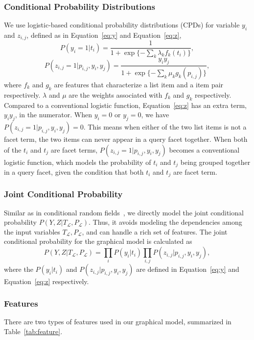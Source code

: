 \subsubsection{Conditional Probability Distributions}
We use logistic-based conditional probability distributions (CPDs) for variable $y_i$ and $z_{i,j}$, defined as in Equation~\ref{eq:y} and Equation~\ref{eq:z},
\begin{equation}
\label{eq:y}
P(y_i = 1|t_i)=\frac{1}{1+\exp\{-\sum_k{\lambda_k f_k(t_i)}\}},
\end{equation}
\begin{equation}
\label{eq:z}
P(z_{i,j} = 1|p_{i,j},y_i, y_j)=\frac{y_i y_j}{1+\exp\{-\sum_k{\mu_k g_k(p_{i,j})}\}},
\end{equation}
where $f_k$ and $g_k$ are features that characterize a list item and a item pair respectively. $\lambda$ and $\mu$ are the weights associated with $f_k$ and $g_k$ respectively. Compared to a conventional logistic function, Equation~\ref{eq:z} has an extra term, $y_iy_j$, in the numerator. When $y_i=0$ or $y_j=0$, we have $P(z_{i,j}=1|p_{i,j},y_i,y_j)=0$. This means when either of the two list items is not a facet term, the two items can never appear in a query facet together.
When both of the $t_i$ and $t_j$ are facet terms, $P(z_{i,j}=1|p_{i,j},y_i,y_j)$ becomes a conventional logistic function, which models the probability of $t_i$ and $t_j$ being grouped together in a query facet, given the condition that both $t_i$ and $t_j$ are facet term.

\subsubsection{Joint Conditional Probability}
Similar as in conditional random fields~\cite{lafferty2001conditional}, we directly model the joint conditional probability $P(Y,Z|T_{\mathcal{L}},P_{\mathcal{L}})$. Thus, it avoids modeling the dependencies among the input variables $T_{\mathcal{L}},P_{\mathcal{L}}$, and can handle a rich set of features. The joint conditional probability for the graphical model is calculated as
\begin{equation}
\label{eq:joint}
P(Y,Z|T_{\mathcal{L}},P_{\mathcal{L}}) = \prod_{i}{P(y_i|t_i)}\prod_{i,j}{P(z_{i,j}|p_{i,j},y_i, y_j)},
\end{equation}
where the $P(y_i|t_i)$ and $P(z_{i,j}|p_{i,j}, y_i, y_j)$ are defined in Equation~\ref{eq:y} and Equation~\ref{eq:z} respectively.

\subsubsection{Features}
\label{sec:facet-features}
There are two types of features used in our graphical model, summarized in Table~\ref{tab:feature}.

